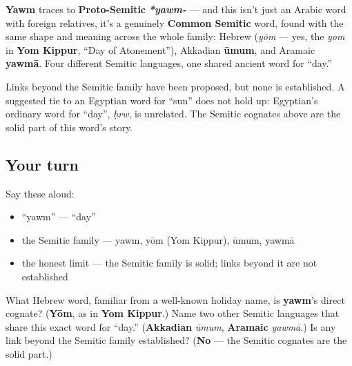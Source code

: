 \begin{culture}
\textbf{Yawm} traces to \textbf{Proto-Semitic} \emph{\textbf{*yawm-}} — and this isn't just an Arabic word with foreign relatives, it's a genuinely \textbf{Common Semitic} word, found with the same shape and meaning across the whole family: Hebrew \textbf{} (\emph{yōm} — yes, the \emph{yom} in \textbf{Yom Kippur}, \textquotedblleft{}Day of Atonement\textquotedblright{}), Akkadian \textbf{ūmum}, and Aramaic \textbf{yawmā}. Four different Semitic languages, one shared ancient word for \textquotedblleft{}day.\textquotedblright{}
\end{culture}

\begin{culture}
Links beyond the Semitic family have been proposed, but none is established. A suggested tie to an Egyptian word for \textquotedblleft{}sun\textquotedblright{} does not hold up: Egyptian's ordinary word for \textquotedblleft{}day\textquotedblright{}, \emph{ḥrw}, is unrelated. The Semitic cognates above are the solid part of this word's story.
\end{culture}

\subsection*{Your turn}
Say these aloud:

\begin{itemize}
\raggedright
  \item \textquotedblleft{}yawm\textquotedblright{} — \textquotedblleft{}day\textquotedblright{}
  \item the Semitic family — yawm, yōm (Yom Kippur), ūmum, yawmā
  \item the honest limit — the Semitic family is solid; links beyond it are not established
\end{itemize}

\begin{tcolorbox}[breakable,colback=teal!4,colframe=teal!35!black,title={Before you move on}]
What Hebrew word, familiar from a well-known holiday name, is \textbf{yawm}'s direct cognate? (\textbf{Yōm}, as in \textbf{Yom Kippur}.) Name two other Semitic languages that share this exact word for \textquotedblleft{}day.\textquotedblright{} (\textbf{Akkadian} \emph{ūmum}, \textbf{Aramaic} \emph{yawmā}.) Is any link beyond the Semitic family established? (\textbf{No} — the Semitic cognates are the solid part.)
\end{tcolorbox}
